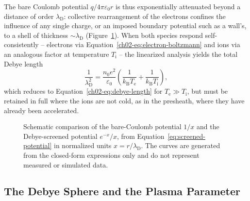 The bare Coulomb potential $q/4\pi\varepsilon_{0} r$ is thus exponentially attenuated beyond a distance of order $\lambda_{\mathrm{D}}$: collective rearrangement of the electrons confines the influence of any single charge, or an imposed boundary potential such as a wall's, to a shell of thickness $\sim \lambda_{\mathrm{D}}$ (Figure~\ref{fig:debye-shielding}). When both species respond self-consistently -- electrons via Equation~\eqref{ch02-eq:electron-boltzmann} and ions via an analogous factor at temperature $T_{\mathrm{i}}$ -- the linearized analysis yields the total Debye length
\begin{equation}
\frac{1}{\lambda_{\mathrm{D}}^{2}} = \frac{n_{0} e^{2}}{\varepsilon_{0}}\left(\frac{1}{k_{\mathrm{B}} T_{\mathrm{e}}} + \frac{1}{k_{\mathrm{B}} T_{\mathrm{i}}}\right),
\label{eq:debye-total}
\end{equation}
which reduces to Equation~\eqref{ch02-eq:debye-length} for $T_{\mathrm{e}} \gg T_{\mathrm{i}}$, but must be retained in full where the ions are not cold, as in the presheath, where they have already been accelerated.

\begin{figure}[htbp]
\centering
{}
\caption{Schematic comparison of the bare-Coulomb potential $1/x$ and the Debye-screened potential $e^{-x}/x$, from Equation~\eqref{eq:screened-potential} in normalized units $x = r/\lambda_{\mathrm{D}}$. The curves are generated from the closed-form expressions only and do not represent measured or simulated data.}
\label{fig:debye-shielding}
\end{figure}

\subsection{The Debye Sphere and the Plasma Parameter}

